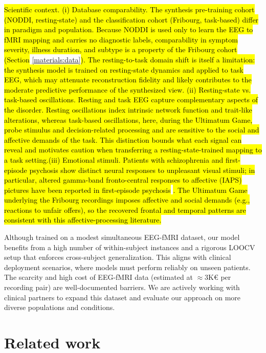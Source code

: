\documentclass{article}
\begin{document}
\noindent\hl{Scientific context. (i) Database comparability. The synthesis pre-training cohort (NODDI, resting-state) and the classification cohort (Fribourg, task-based) differ in paradigm and population. Because NODDI is used only to learn the EEG to fMRI mapping and carries no diagnostic labels, comparability in symptom severity, illness duration, and subtype is a property of the Fribourg cohort (Section }\ref{materials:data}\hl{). The resting-to-task domain shift is itself a limitation: the synthesis model is trained on resting-state dynamics and applied to task EEG, which may attenuate reconstruction fidelity and likely contributes to the moderate predictive performance of the synthesized view. (ii) Resting-state vs. task-based oscillations. Resting and task EEG capture complementary aspects of the disorder. Resting oscillations index intrinsic network function and trait-like alterations, whereas task-based oscillations, here, during the Ultimatum Game, probe stimulus and decision-related processing and are sensitive to the social and affective demands of the task. This distinction bounds what each signal can reveal and motivates caution when transferring a resting-state-trained mapping to a task setting.(iii) Emotional stimuli. Patients with schizophrenia and first-episode psychosis show distinct neural responses to unpleasant visual stimuli; in particular, altered gamma-band fronto-central responses to affective (IAPS) pictures have been reported in first-episode psychosis }\cite{aydin2018cortical}\hl{. The Ultimatum Game underlying the Fribourg recordings imposes affective and social demands (e.g., reactions to unfair offers), so the recovered frontal and temporal patterns are consistent with this affective-processing literature.}

Although trained on a modest simultaneous EEG-fMRI dataset, our model benefits from a high number of within-subject instances and a rigorous LOOCV setup that enforces cross-subject generalization. This aligns with clinical deployment scenarios, where models must perform reliably on unseen patients. The scarcity and high cost of EEG-fMRI data (estimated at $\approx3$K€ per recording pair) are well-documented barriers. We are actively working with clinical partners to expand this dataset and evaluate our approach on more diverse populations and conditions.

\section{Related work}\label{section:related_work}
\end{document}
